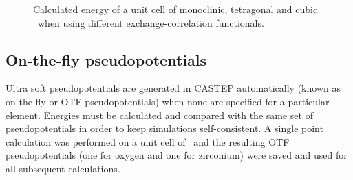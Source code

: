 \begin{figure}[ht!]
  \begin{center}
    \caption{Calculated energy of a unit cell of monoclinic, tetragonal and cubic \zirconia\ when using different exchange-correlation functionals.}
    \label{Figure:xc_test}
  \end{center}
\end{figure}

\subsection{On-the-fly pseudopotentials}

Ultra soft pseudopotentials are generated in CASTEP automatically (known as on-the-fly or OTF pseudopotentials) when none are specified for a particular element. Energies must be calculated and compared with the same set of pseudopotentials in order to keep simulations self-consistent. A single point calculation was performed on a unit cell of \zirconia\ and the resulting OTF pseudopotentials (one for oxygen and one for zirconium) were saved and used for all subsequent calculations. 


